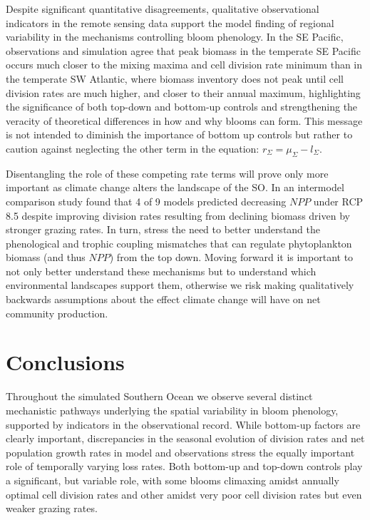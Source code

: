 Despite significant quantitative disagreements, qualitative observational indicators in the remote sensing data support the model finding of regional variability in the mechanisms controlling bloom phenology. In the SE Pacific, observations and simulation agree that peak biomass in the temperate SE Pacific occurs much closer to the mixing maxima and cell division rate minimum than in the temperate SW Atlantic, where biomass inventory does not peak until cell division rates are much higher, and closer to their annual maximum, highlighting the significance of both top-down and bottom-up controls and strengthening the veracity of theoretical differences in how and why blooms can form. This message is not intended to diminish the importance of bottom up controls but rather to caution against neglecting the other term in the equation: $r_\Sigma =\mu_\Sigma - l_\Sigma$.

Disentangling the role of these competing rate terms will prove only more important as climate change alters the landscape of the SO. In an intermodel comparison study \parencite{LaufkotterDriversuncertaintiesfuture2015} found that 4 of 9 models predicted decreasing $NPP$ under RCP 8.5 despite improving division rates resulting from declining biomass driven by stronger grazing rates. In turn, \textcite{LaufkotterDriversuncertaintiesfuture2015} stress the need to better understand the phenological and trophic coupling mismatches that can regulate phytoplankton biomass (and thus $NPP$) from the top down. Moving forward it is important to not only better understand these mechanisms but to understand which environmental landscapes support them, otherwise we risk making qualitatively backwards assumptions about the effect climate change will have on net community production.  


\section{Conclusions}

Throughout the simulated Southern Ocean we observe several distinct mechanistic pathways underlying the spatial variability in bloom phenology, supported by indicators in the observational record. While bottom-up factors are clearly important, discrepancies in the seasonal evolution of division rates and net population growth rates in model and observations stress the equally important role of temporally varying loss rates. Both bottom-up and top-down controls play a significant, but variable role, with some blooms climaxing amidst annually optimal cell division rates and other amidst very poor cell division rates but even weaker grazing rates. 

